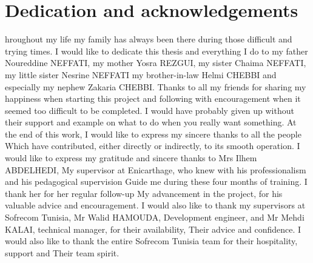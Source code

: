%
%

\chapter*{Dedication and acknowledgements}
\begin{SingleSpace}
hroughout my life my family has always been there during those difficult and trying times. I would 
like to dedicate this thesis and everything I do to my father Noureddine NEFFATI, my mother Yosra REZGUI, my 
sister Chaima NEFFATI, my little sister Nesrine NEFFATI my brother-in-law Helmi CHEBBI and especially my nephew 
Zakaria CHEBBI.
Thanks to all my friends for sharing my happiness when starting this project and following with encouragement when it seemed too difficult to be completed. 
I would have probably given up without their support and example on what to do when you really want something.
At the end of this work, I would like to express my sincere thanks to all the people
Which have contributed, either directly or indirectly, to its smooth operation.
I would like to express my gratitude and sincere thanks to Mrs Ilhem ABDELHEDI,
My supervisor at Enicarthage, who knew with his professionalism and his pedagogical supervision
Guide me during these four months of training. I thank her for her regular follow-up
My advancement in the project, for his valuable advice and encouragement.
I would also like to thank my supervisors at Sofrecom Tunisia, Mr Walid HAMOUDA,
Development engineer, and Mr Mehdi KALAI, technical manager, for their availability,
Their advice and confidence.
I would also like to thank the entire Sofrecom Tunisia team for their hospitality, support and
Their team spirit.

\end{SingleSpace}
\clearpage